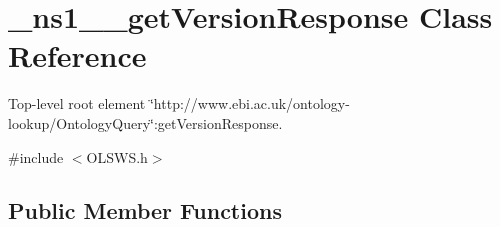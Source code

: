 \hypertarget{class__ns1____getVersionResponse}{
\section{\_\-ns1\_\-\_\-getVersionResponse Class Reference}
\label{class__ns1____getVersionResponse}
}


Top-\/level root element \char`\"{}http://www.ebi.ac.uk/ontology-\/lookup/OntologyQuery\char`\"{}:getVersionResponse.  




{\ttfamily \#include $<$OLSWS.h$>$}

\subsection*{Public Member Functions}
